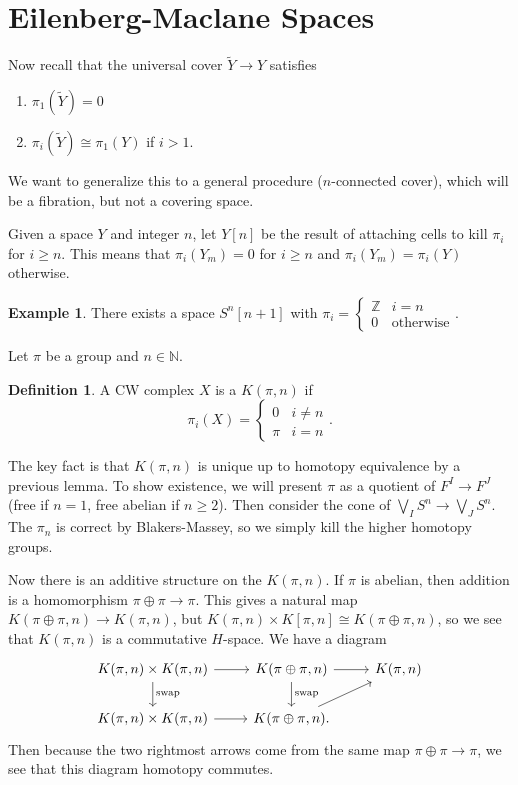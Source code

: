 \documentclass[leqno, openany]{memoir}
\theoremstyle{definition}
\newtheorem{defn}[thm]{Definition}
\newtheorem{exm}[thm]{Example}
\theoremstyle{remark}
\theoremstyle{plain}
\theoremstyle{definition}
\theoremstyle{remark}
\newcommand{\N}{\mathbb{N}}
\newcommand{\Z}{\mathbb{Z}}
\newcommand{\wt}[1]{\widetilde{#1}}
\begin{document}
\section{Eilenberg-Maclane Spaces}%
\label{sec:killing_homotopy_groups}

Now recall that the universal cover $\wt{Y} \to Y$ satisfies 
\begin{enumerate}
    \item $\pi_1(\wt{Y}) = 0$
    \item $\pi_i(\wt{Y}) \cong \pi_1(Y)$ if $i > 1$.
\end{enumerate}
We want to generalize this to a general procedure ($n$-connected cover), which will be a fibration, but not a covering space.

Given a space $Y$ and integer $n$, let $Y[n]$ be the result of attaching cells to kill $\pi_i$ for $i \geq n$. This means that $\pi_i(Y_m) = 0$ for $i \geq n$ and $\pi_i(Y_m) = \pi_i(Y)$ otherwise.

\begin{exm}
    There exists a space $S^n[n+1]$ with $\pi_i = \begin{cases}
        \Z & i = n \\
        0 & \text{otherwise}
    \end{cases}$.
\end{exm}

Let $\pi$ be a group and $n \in \N$. 
\begin{defn}
    A CW complex $X$ is a $K(\pi, n)$ if
    \[ \pi_i(X) = \begin{cases}
        0 & i \neq n \\
        \pi & i = n
    \end{cases}. \]
\end{defn}

The key fact is that $K(\pi, n)$ is unique up to homotopy equivalence by a previous lemma. To show existence, we will present $\pi$ as a quotient of $F^I \to F^J$ (free if $n=1$, free abelian if $n \geq 2$). Then consider the cone of $\bigvee_I S^n \to \bigvee_J S^n$. The $\pi_n$ is correct by Blakers-Massey, so we simply kill the higher homotopy groups.

Now there is an additive structure on the $K(\pi,n)$. If $\pi$ is abelian, then addition is a homomorphism $\pi \oplus \pi \to \pi$. This gives a natural map $K(\pi \oplus \pi, n) \to K(\pi,n)$, but $K(\pi,n) \times K[\pi, n] \cong K(\pi \oplus \pi, n)$, so we see that $K(\pi,n)$ is a commutative $H$-space. We have a diagram
\begin{equation*}
\begin{tikzcd}
    K(\pi,n) \times K(\pi, n) \arrow{d}{\text{swap}} \arrow{r} & K(\pi \oplus \pi, n) \arrow{r} \arrow{d}{\text{swap}} &  K(\pi,n) \\
    K(\pi, n) \times K(\pi, n) \arrow{r} & K(\pi \oplus \pi, n). \arrow{ur}
\end{tikzcd}
\end{equation*}
Then because the two rightmost arrows come from the same map $\pi \oplus \pi \to \pi$, we see that this diagram homotopy commutes.
\end{document}

